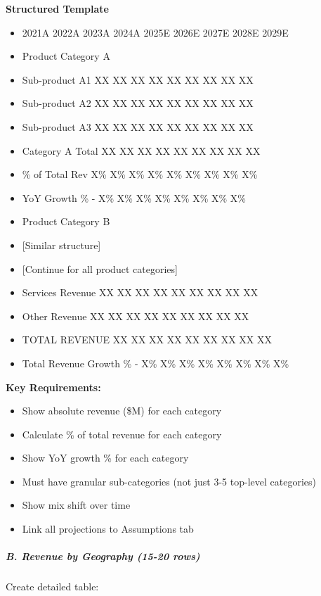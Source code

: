 \documentclass[11pt]{article}
\begin{document}
\textbf{Structured Template}
\begin{itemize}[leftmargin=*,itemsep=2pt,topsep=2pt]
\item {} 2021A 2022A 2023A 2024A 2025E 2026E 2027E 2028E 2029E
\item {} Product Category A
\item {} Sub-product A1 XX XX XX XX XX XX XX XX XX
\item {} Sub-product A2 XX XX XX XX XX XX XX XX XX
\item {} Sub-product A3 XX XX XX XX XX XX XX XX XX
\item {} Category A Total XX XX XX XX XX XX XX XX XX
\item {} \% of Total Rev X\% X\% X\% X\% X\% X\% X\% X\% X\%
\item {} YoY Growth \% - X\% X\% X\% X\% X\% X\% X\% X\%
\item {} Product Category B
\item {} [Similar structure]
\item {} [Continue for all product categories]
\item {} Services Revenue XX XX XX XX XX XX XX XX XX
\item {} Other Revenue XX XX XX XX XX XX XX XX XX
\item {} TOTAL REVENUE XX XX XX XX XX XX XX XX XX
\item {} Total Revenue Growth \% - X\% X\% X\% X\% X\% X\% X\% X\%
\end{itemize}

\textbf{Key Requirements:}

\begin{itemize}[leftmargin=*,itemsep=2pt,topsep=2pt]
\item {} Show absolute revenue (\$M) for each category
\item {} Calculate \% of total revenue for each category
\item {} Show YoY growth \% for each category
\item {} Must have granular sub-categories (not just 3-5 top-level categories)
\item {} Show mix shift over time
\item {} Link all projections to Assumptions tab
\end{itemize}

\subparagraph{B. Revenue by Geography (15-20 rows)}\mbox{}\par

Create detailed table:
\end{document}
